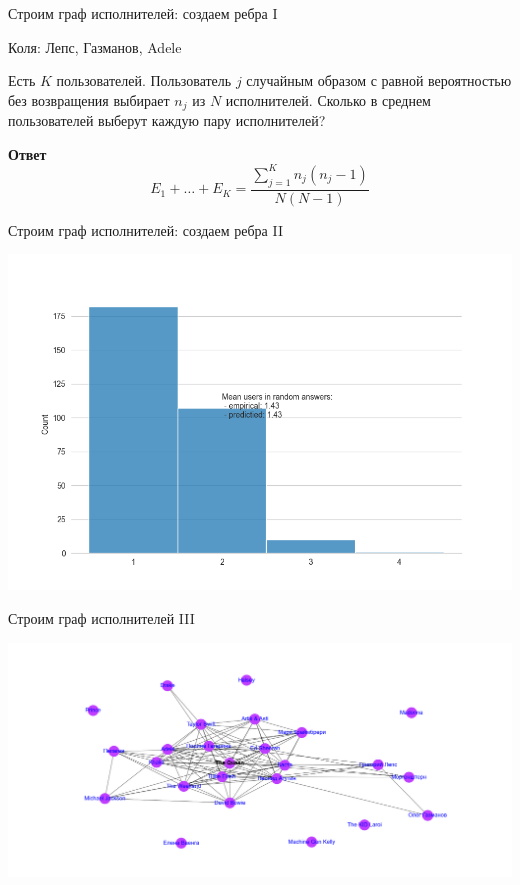 \documentclass[11pt,aspectratio=169,handout]{beamer}
\begin{document}
\begin{frame}{Строим граф исполнителей: создаем ребра I}

Коля: Лепс, Газманов, Adele

\pause

\begin{center}
\begin{tcolorbox}[colback=info!5,colframe=info!70,title=Задача]
Есть $K$ пользователей. Пользователь $j$ случайным образом с равной вероятностью без возвращения выбирает $n_j$ из $N$ исполнителей. Сколько в среднем пользователей выберут каждую пару исполнителей? 
\end{tcolorbox}
\end{center}

\pause

{\bf Ответ}
\[
E_1 + \ldots + E_K = \frac{\sum_{j=1}^K n_j (n_j - 1)}{N (N-1)}
\]
	
\end{frame}

\begin{frame}{Строим граф исполнителей: создаем ребра II}

\begin{center}
\includegraphics[scale=0.4]{images/user_counts.png}
\end{center}

\end{frame}

\begin{frame}{Строим граф исполнителей III}

\begin{center}
\includegraphics[scale=0.35]{images/graph.png}
\end{center}

\end{frame}
\end{document}
